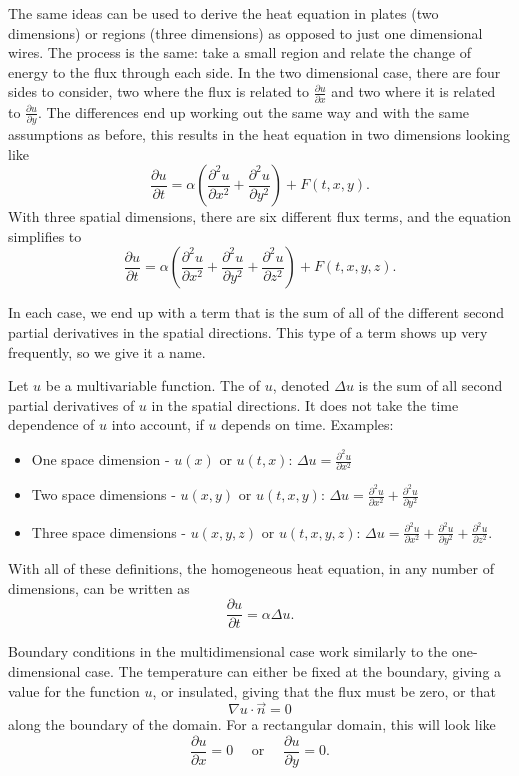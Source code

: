 \documentclass{ximera}
\begin{document}
The same ideas can be used to derive the heat equation in plates (two dimensions) or regions (three dimensions) as opposed to just one dimensional wires. The process is the same: take a small region and relate the change of energy to the flux through each side. In the two dimensional case, there are four sides to consider, two where the flux is related to $\frac{\partial u}{\partial x}$ and two where it is related to $\frac{\partial u}{\partial y}$. The differences end up working out the same way and with the same assumptions as before, this results in the heat equation in two dimensions looking like
\[ 
    \frac{\partial u}{\partial t} = \alpha \left( \frac{\partial^2 u}{\partial x^2} + \frac{\partial^2 u}{\partial y^2}\right) + F(t,x, y). 
\] 
With three spatial dimensions, there are six different flux terms, and the equation simplifies to 
\[ 
    \frac{\partial u}{\partial t} = \alpha \left( \frac{\partial^2 u}{\partial x^2} + \frac{\partial^2 u}{\partial y^2} + \frac{\partial^2 u}{\partial z^2} \right) + F(t,x, y, z). 
\]

In each case, we end up with a term that is the sum of all of the different second partial derivatives in the spatial directions. This type of a term shows up very frequently, so we give it a name. 
\begin{definition}
    Let $u$ be a multivariable function. The \emph{} of $u$, denoted $\Delta u$ is the sum of all second partial derivatives of $u$ in the spatial directions. It does not take the time dependence of $u$ into account, if $u$ depends on time.  Examples:
    \begin{itemize}
        \item One space dimension - $u(x)$ or $u(t,x)$: $\Delta u = \frac{\partial^2 u}{\partial x^2}$
        \item Two space dimensions - $u(x,y)$ or $u(t,x,y)$: $\Delta u = \frac{\partial^2 u}{\partial x^2} + \frac{\partial^2 u}{\partial y^2}$
        \item Three space dimensions - $u(x,y,z)$ or $u(t,x,y,z)$: $\Delta u = \frac{\partial^2 u}{\partial x^2} + \frac{\partial^2 u}{\partial y^2} + \frac{\partial^2 u}{\partial z^2}$.
    \end{itemize}
\end{definition}

With all of these definitions, the homogeneous heat equation, in any number of dimensions, can be written as
\[ 
    \frac{\partial u}{\partial t} = \alpha \Delta u. 
\]

Boundary conditions in the multidimensional case work similarly to the one-dimensional case. The temperature can either be fixed at the boundary, giving a value for the function $u$, or insulated, giving that the flux must be zero, or that 
\[ 
    \nabla u \cdot \vec{n} = 0 
\] 
along the boundary of the domain. For a rectangular domain, this will look like
\[ 
    \frac{\partial u}{\partial x} = 0 \quad \text{ or } \quad \frac{\partial u}{\partial y} = 0. 
\]
\end{document}
